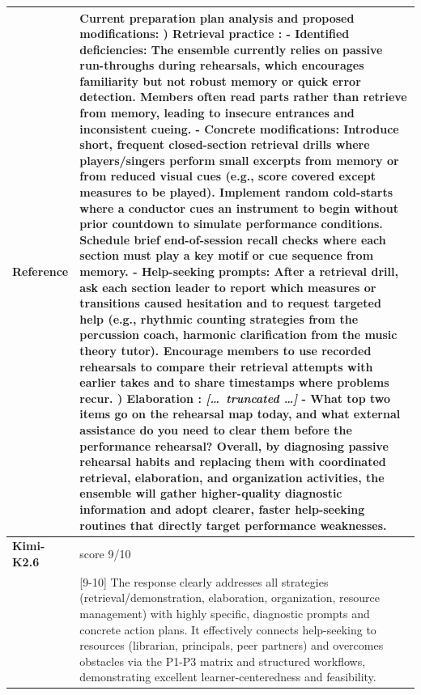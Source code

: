 \begin{longtable}{@{}l p{12.5cm}@{}}
  \textbf{Reference} & Current preparation plan analysis and proposed modifications: \newline 1) Retrieval practice : \newline - Identified deficiencies: The ensemble currently relies on passive run-throughs during rehearsals, which encourages familiarity but not robust memory or quick error detection. Members often read parts rather than retrieve from memory, leading to insecure entrances and inconsistent cueing. \newline - Concrete modifications: Introduce short, frequent closed-section retrieval drills where players/singers perform small excerpts from memory or from reduced visual cues (e.g., score covered except measures to be played). Implement random cold-starts where a conductor cues an instrument to begin without prior countdown to simulate performance conditions. Schedule brief end-of-session recall checks where each section must play a key motif or cue sequence from memory. \newline - Help-seeking prompts: After a retrieval drill, ask each section leader to report which measures or transitions caused hesitation and to request targeted help (e.g., rhythmic counting strategies from the percussion coach, harmonic clarification from the music theory tutor). Encourage members to use recorded rehearsals to compare their retrieval attempts with earlier takes and to share timestamps where problems recur. \newline 2) Elaboration : \newline \textit{[\ldots\ truncated \ldots]} \newline - What top two items go on the rehearsal map today, and what external assistance do you need to clear them before the performance rehearsal? \newline Overall, by diagnosing passive rehearsal habits and replacing them with coordinated retrieval, elaboration, and organization activities, the ensemble will gather higher-quality diagnostic information and adopt clearer, faster help-seeking routines that directly target performance weaknesses. \\
  \midrule
  \textbf{Kimi-K2.6} & score 9/10 \\
  & [9-10] The response clearly addresses all strategies (retrieval/demonstration, elaboration, organization, resource management) with highly specific, diagnostic prompts and concrete action plans. It effectively connects help-seeking to resources (librarian, principals, peer partners) and overcomes obstacles via the P1-P3 matrix and structured workflows, demonstrating excellent learner-centeredness and feasibility. \\

\end{longtable}
